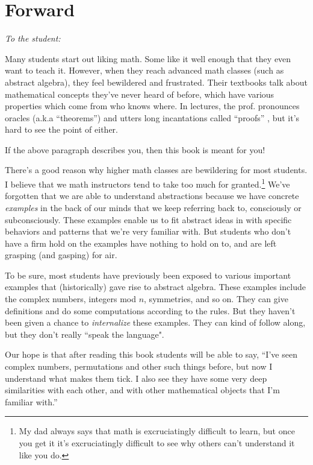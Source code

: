 \chapter*{Forward}

\emph{To the student:}
\medskip

Many students start out liking math. Some like it well enough that they even want to teach it. However, when they reach advanced math classes (such as abstract algebra), they feel bewildered and frustrated. Their textbooks talk about mathematical concepts they've never heard of before, which have various properties which come from who knows where. In lectures, the prof. pronounces oracles (a.k.a “theorems”) and utters long incantations called ``proofs'' , but it's hard to see the point of either. 
\medskip

If the above paragraph describes you, then this book is meant for you!
\medskip

There's a good reason why higher math classes are bewildering for most students. I believe that we math instructors tend to take too much for granted.\footnote{My dad always says that math is excruciatingly difficult to learn, but once you get  it it's excruciatingly difficult to see why others can't understand it like you do.} We've forgotten that we are able to understand abstractions because we have concrete \emph{examples} in the back of our minds that we keep referring back to, consciously or subconsciously. These examples enable us to fit abstract ideas in with specific behaviors and patterns that we're very familiar with. But students who don't have a firm hold on the examples have nothing to hold on to, and are left grasping (and gasping) for air. 

To be sure, most students have previously been exposed to various important examples that (historically) gave rise to abstract algebra. These examples include the complex numbers, integers mod $n$, symmetries, and so on. They can give definitions and do some computations according to the rules. But they haven't been given a chance to \emph{internalize} these examples.  They can kind of follow along, but they don't really ``speak the language".

Our hope is that after reading this book students will be able to say, ``I've seen complex numbers, permutations and other such things before, but now I understand what makes them tick. I also see they have some very deep similarities with each other, and with other mathematical objects that I'm familiar with.'' 

